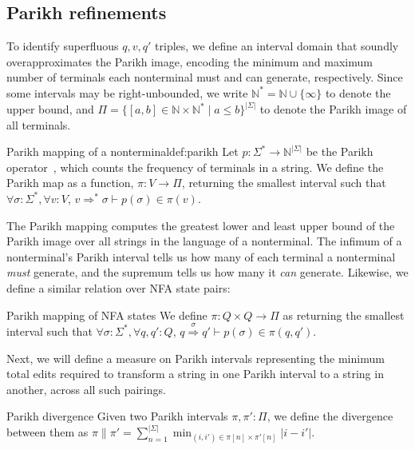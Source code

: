 \subsection{Parikh refinements}

To identify superfluous $q, v, q'$ triples, we define an interval domain that soundly overapproximates the Parikh image, encoding the minimum and maximum number of terminals each nonterminal must and can generate, respectively. Since some intervals may be right-unbounded, we write $\mathbb{N}^*=\mathbb{N} \cup \{\infty\}$ to denote the upper bound, and $\Pi = \{[a, b] \in \mathbb{N} \times \mathbb{N}^* \mid a \leq b\}^{|\Sigma|}$ to denote the Parikh image of all terminals.

\begin{definition}{Parikh mapping of a nonterminal}{def:parikh}
Let $p: \Sigma^*\rightarrow\mathbb{N}^{|\Sigma|}$ be the Parikh operator~\cite{parikh1966context}, which counts the frequency of terminals in a string. We define the Parikh map as a function, $\pi: V \rightarrow \Pi$, returning the smallest interval such that $\forall \sigma: \Sigma^*, \forall v: V$, $v \Rightarrow^* \sigma \vdash p(\sigma) \in \pi(v)$.
\end{definition}

The Parikh mapping computes the greatest lower and least upper bound of the Parikh image over all strings in the language of a nonterminal. The infimum of a nonterminal's Parikh interval tells us how many of each terminal a nonterminal \textit{must} generate, and the supremum tells us how many it \textit{can} generate. Likewise, we define a similar relation over NFA state pairs:

\begin{definition}{Parikh mapping of NFA states}{}
  We define $\pi: Q\times Q \rightarrow \Pi$ as returning the smallest interval such that $\forall \sigma: \Sigma^*, \forall q, q': Q$, $q \overset{\sigma}{\Longrightarrow} q' \vdash p(\sigma) \in \pi(q, q')$.
\end{definition}

Next, we will define a measure on Parikh intervals representing the minimum total edits required to transform a string in one Parikh interval to a string in another, across all such pairings.

\begin{definition}{Parikh divergence}{}
  Given two Parikh intervals $\pi, \pi': \Pi$, we define the divergence between them as $\pi \parallel \pi' = \sum_{n=1}^{|\Sigma|} \min_{(i, i') \in \pi[n]\times \pi'[n]} |i - i'|$.
\end{definition}

